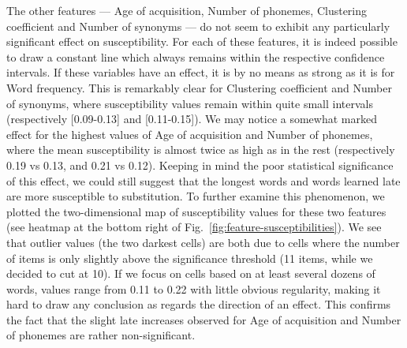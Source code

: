 The other features --- Age of acquisition, Number of phonemes, Clustering coefficient and Number of synonyms --- do not seem to exhibit any particularly significant effect on susceptibility.
For each of these features, it is indeed possible to draw a constant line which always remains within the respective confidence intervals.
If these variables have an effect, it is by no means as strong as it is for Word frequency.
This is remarkably clear for Clustering coefficient and Number of synonyms, where susceptibility values remain within quite small intervals (respectively [0.09-0.13] and [0.11-0.15]).
We may notice a somewhat marked effect for the highest values of Age of acquisition and Number of phonemes, where the mean susceptibility is almost twice as high as in the rest (respectively 0.19 vs 0.13, and 0.21 vs 0.12).
Keeping in mind the poor statistical significance of this effect, we could still suggest that the longest words and words learned late are more susceptible to substitution.
To further examine this phenomenon, we plotted the two-dimensional map of susceptibility values for these two features (see heatmap at the bottom right of Fig.~\ref{fig:feature-susceptibilities}).
We see that outlier values (the two darkest cells) are both due to cells where the number of items is only slightly above the significance threshold (11 items, while we decided to cut at 10).
If we focus on cells based on at least several dozens of words, values range from 0.11 to 0.22 with little obvious regularity, making it hard to draw any conclusion as regards the direction of an effect.
This confirms the fact that the slight late increases observed for Age of acquisition and Number of phonemes are rather non-significant.



